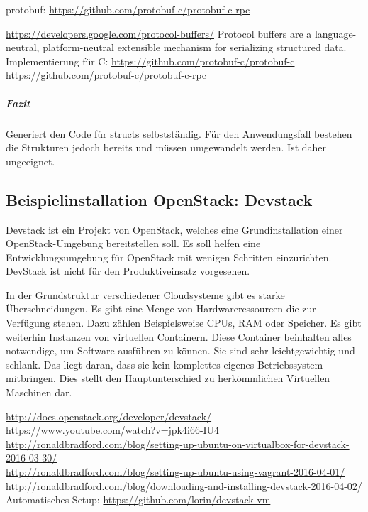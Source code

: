 \documentclass[a4paper,10pt]{article}
\begin{document}
protobuf: \url{https://github.com/protobuf-c/protobuf-c-rpc}

\url{https://developers.google.com/protocol-buffers/}
Protocol buffers are a language-neutral, platform-neutral extensible mechanism for serializing structured data.
Implementierung für C:
\url{https://github.com/protobuf-c/protobuf-c}
\url{https://github.com/protobuf-c/protobuf-c-rpc}

\subparagraph{Fazit}

Generiert den Code für structs selbstständig.
Für den Anwendungsfall bestehen die Strukturen jedoch bereits und müssen umgewandelt werden.
Ist daher ungeeignet.

\subsection{Beispielinstallation OpenStack: Devstack}


Devstack ist ein Projekt von OpenStack, welches eine Grundinstallation einer OpenStack-Umgebung bereitstellen soll.
Es soll helfen eine Entwicklungsumgebung für OpenStack mit wenigen Schritten einzurichten.
DevStack ist nicht für den Produktiveinsatz vorgesehen.

In der Grundstruktur verschiedener Cloudsysteme gibt es starke Überschneidungen. 
Es gibt eine Menge von Hardwareressourcen die zur Verfügung stehen.
Dazu zählen Beispielsweise CPUs, RAM oder Speicher.
Es gibt weiterhin Instanzen von virtuellen Containern.
Diese Container beinhalten alles notwendige, um Software ausführen zu können.
Sie sind sehr leichtgewichtig und schlank.
Das liegt daran, dass sie kein komplettes eigenes Betriebssystem mitbringen.
Dies stellt den Hauptunterschied zu herkömmlichen Virtuellen Maschinen dar.

\url{http://docs.openstack.org/developer/devstack/}\\
\url{https://www.youtube.com/watch?v=jpk4i66-IU4}\\
\url{http://ronaldbradford.com/blog/setting-up-ubuntu-on-virtualbox-for-devstack-2016-03-30/}\\
\url{http://ronaldbradford.com/blog/setting-up-ubuntu-using-vagrant-2016-04-01/}\\
\url{http://ronaldbradford.com/blog/downloading-and-installing-devstack-2016-04-02/}\\

Automatisches Setup: \url{https://github.com/lorin/devstack-vm}
\end{document}
